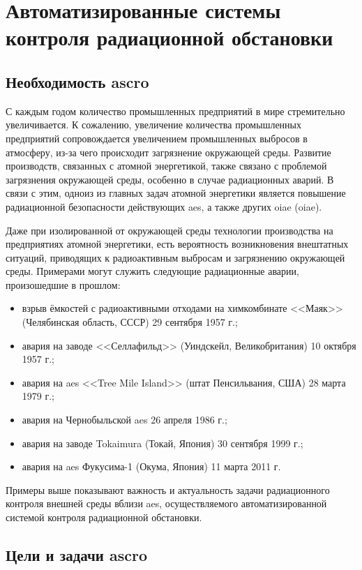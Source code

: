 \chapter{Автоматизированные системы контроля радиационной обстановки}

\section{Необходимость \ac{ascro}}

С каждым годом количество промышленных предприятий в мире стремительно увеличивается. К сожалению, увеличение количества 
промышленных предприятий сопровождается увеличением промышленных выбросов в атмосферу, из-за чего происходит загрязнение 
окружающей среды. Развитие производств, связанных с атомной энергетикой, также связано с проблемой загрязнения 
окружающей среды, особенно в случае радиационных аварий. В связи с этим, одноиз из главных задач атомной энергетики 
является повышение радиационной безопасности действующих \ac{aes}, а также других \ac{oiae} (\acl{oiae}).

Даже при изолированной от окружающей среды технологии производства на предприятиях атомной энергетики, есть вероятность 
возникновения внештатных ситуаций, приводящих к радиоактивным выбросам и загрязнению окружающей среды. Примерами могут 
служить следующие радиационные аварии, произошедшие в прошлом:

\begin{itemize}
	\item взрыв ёмкостей с радиоактивными отходами на химкомбинате <<Маяк>> (Челябинская область, СССР) 29 сентября 
		1957 г.;
	\item авария на заводе <<Селлафильд>> (Уиндскейл, Великобритания) 10 октября 1957 г.;
	\item авария на \ac{aes} <<Tree Mile Island>> (штат Пенсильвания, США) 28 марта 1979 г.;
	\item авария на Чернобыльской \ac{aes} 26 апреля 1986 г.;
	\item авария на заводе Tokaimura (Токай, Япония) 30 сентября 1999 г.;
	\item авария на \ac{aes} Фукусима-1 (Окума, Япония) 11 марта 2011 г.
\end{itemize}

Примеры выше показывают важность и актуальность задачи радиационного контроля внешней среды вблизи \ac{aes}, 
осуществляемого автоматизированной системой контроля радиационной обстановки. 

\section{Цели и задачи \ac{ascro}}

